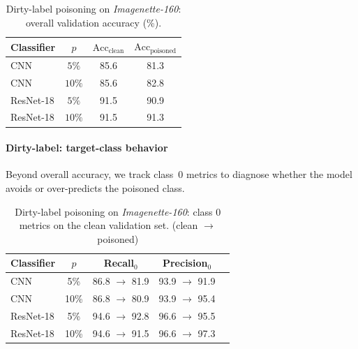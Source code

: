 \documentclass{article}
\begin{document}
\begin{table}[H]
  \caption{Dirty-label poisoning on \textit{Imagenette-160}: overall validation accuracy (\%).}
  \label{tab:dirtylabel}
  \centering
  \begin{small}
    \begin{tabular}{lccc}
      \toprule
      Classifier            & $p$  & $\text{Acc}_{\text{clean}}$ & $\text{Acc}_{\text{poisoned}}$ \\
      \midrule
      CNN              & $5\%$  & 85.6 & 81.3 \\
      CNN              & $10\%$ & 85.6 & 82.8 \\
      ResNet-18\footnotemark[6] & $5\%$  & 91.5 & 90.9 \\
      ResNet-18\footnotemark[6] & $10\%$ & 91.5 & 91.3 \\
      \bottomrule
    \end{tabular}
  \end{small}
  \vspace{-0.35cm}
\end{table}


\paragraph{Dirty-label: target-class behavior}
Beyond overall accuracy, we track class~0 metrics to diagnose whether the model avoids or over-predicts the poisoned class. 

\begin{table}[H]
  \caption{Dirty-label poisoning on \textit{Imagenette-160}: class 0 metrics on the clean validation set. (clean $\rightarrow$ poisoned)}
  \label{tab:dirtylabel-class0}
  \centering
  \begin{small}
  \begin{tabular}{lcccc}
    \toprule
    Classifier & $p$ & Recall$_0$ & Precision$_0$ \\
    \midrule
    CNN        & 5\%  & 86.8 $\rightarrow$ 81.9  & 93.9 $\rightarrow$ 91.9 \\
    CNN        & 10\% & 86.8 $\rightarrow$ 80.9  & 93.9 $\rightarrow$ 95.4 \\
    ResNet-18\footnotemark[6] & 5\%  & 94.6 $\rightarrow$ 92.8  & 96.6 $\rightarrow$ 95.5 \\
    ResNet-18\footnotemark[6] & 10\% & 94.6 $\rightarrow$ 91.5  & 96.6 $\rightarrow$ 97.3 \\
    \bottomrule
  \end{tabular}
  \end{small}
  \vspace{-0.35cm}
\end{table}
\end{document}
